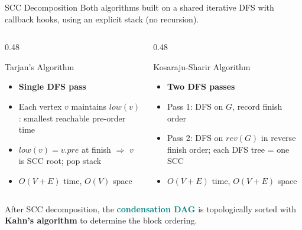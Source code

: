 \documentclass[aspectratio=169]{beamer}
\newcommand{\highlight}[1]{\textcolor{teal}{\textbf{#1}}}
\begin{document}
\begin{frame}{SCC Decomposition}
  Both algorithms built on a shared iterative DFS with callback hooks, using an explicit stack (no recursion). 

  \vspace{0.4em}
  \begin{columns}[T]
    \begin{column}{0.48\textwidth}
      \begin{block}{Tarjan's Algorithm}
        \begin{itemize}
          \item \textbf{Single DFS pass}
          \item Each vertex $v$ maintains $\mathit{low}(v)$: smallest reachable pre-order time
          \item $\mathit{low}(v) = v.\mathit{pre}$ at finish $\Rightarrow$ $v$ is SCC root; pop stack
          \item $O(V+E)$ time, $O(V)$ space
        \end{itemize}
      \end{block}
    \end{column}
    \begin{column}{0.48\textwidth}
      \begin{block}{Kosaraju-Sharir Algorithm}
        \begin{itemize}
          \item \textbf{Two DFS passes}
          \item Pass 1: DFS on $G$, record finish order
          \item Pass 2: DFS on $\mathit{rev}(G)$ in reverse finish order; each DFS tree = one SCC
          \item $O(V+E)$ time, $O(V+E)$ space
        \end{itemize}
      \end{block}
    \end{column}
  \end{columns}

  \vspace{0.4em}
  After SCC decomposition, the \highlight{condensation DAG} is topologically sorted with
  \textbf{Kahn's algorithm} to determine the block ordering.
\end{frame}
\end{document}
